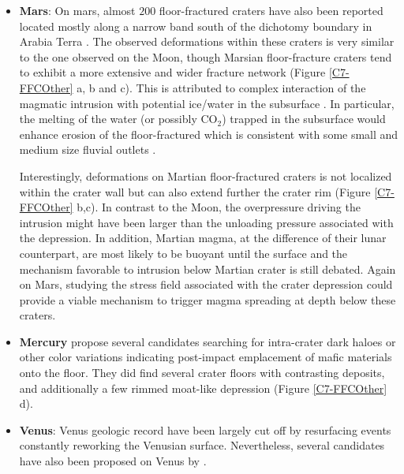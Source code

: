 \begin{itemize}
\item  \textbf{Mars}: On  mars, almost  $200$ floor-fractured  craters
  have also been reported located mostly  along a narrow band south of
  the dichotomy boundary in  Arabia Terra \citep{Bamberg:2014hb}.  The
  observed deformations  within these craters  is very similar  to the
  one observed on the Moon, though Marsian floor-fracture craters tend
  to  exhibit a  more  extensive and  wider  fracture network  (Figure
  \ref{C7-FFCOther}  a,  b and  c).   This  is attributed  to  complex
  interaction of  the magmatic  intrusion with potential  ice/water in
  the  subsurface  \citep{Sato:2010ex,Bamberg:2014hb}. In  particular,
  the  melting  of the  water  (or  possibly  CO$_2$) trapped  in  the
  subsurface  would enhance  erosion of  the floor-fractured  which is
  consistent  with   some  small  and  medium   size  fluvial  outlets
  \citep{Sato:2010ex}.

  Interestingly,  deformations on  Martian floor-fractured  craters is
  not localized within the crater wall but can also extend further the
  crater rim (Figure \ref{C7-FFCOther} b,c).  In contrast to the Moon,
  the overpressure driving  the intrusion might have  been larger than
  the unloading pressure associated with the depression.  In addition,
  Martian magma,  at the  difference of  their lunar  counterpart, are
  most  likely to  be  buoyant  until the  surface  and the  mechanism
  favorable to intrusion below Martian crater is still debated.  Again
  on  Mars,  studying the  stress  field  associated with  the  crater
  depression  could  provide  a  viable  mechanism  to  trigger  magma
  spreading at depth below these craters.

\item   \textbf{Mercury}    \citet{Schultz:1977ec}   propose   several
  candidates  searching for  intra-crater dark  haloes or  other color
  variations  indicating post-impact  emplacement  of mafic  materials
  onto  the  floor.    They  did  find  several   crater  floors  with
  contrasting  deposits,  and  additionally  a  few  rimmed  moat-like
  depression (Figure \ref{C7-FFCOther} d).
  
\item \textbf{Venus}: Venus geologic record  have been largely cut off
  by  resurfacing events  constantly reworking  the Venusian  surface.
  Nevertheless, several candidates have also been proposed on Venus by
  \citet{Wichman:1995ju}.
\end{itemize}

